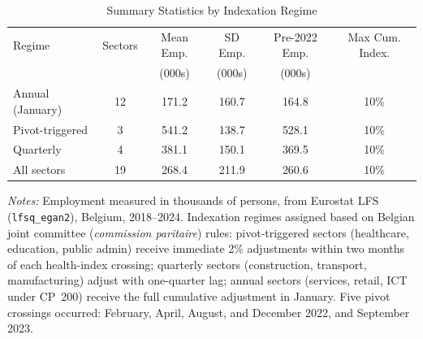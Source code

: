 \begin{table}[t]
\centering
\caption{Summary Statistics by Indexation Regime}
\label{tab:summary}
\begin{tabular}{lccccc}
\hline\hline
Regime & Sectors & Mean Emp. & SD Emp. & Pre-2022 Emp. & Max Cum. Index. \\
 & & (000s) & (000s) & (000s) & \\
\hline
Annual (January) & 12 & 171.2 & 160.7 & 164.8 & 10\% \\
Pivot-triggered & 3 & 541.2 & 138.7 & 528.1 & 10\% \\
Quarterly & 4 & 381.1 & 150.1 & 369.5 & 10\% \\
\hline
All sectors & 19 & 268.4 & 211.9 & 260.6 & 10\% \\
\hline\hline
\end{tabular}
\begin{tablenotes}[flushleft]
\small
\item \textit{Notes:} Employment measured in thousands of persons, from Eurostat LFS (\texttt{lfsq\_egan2}), Belgium, 2018--2024. Indexation regimes assigned based on Belgian joint committee (\textit{commission paritaire}) rules: pivot-triggered sectors (healthcare, education, public admin) receive immediate 2\% adjustments within two months of each health-index crossing; quarterly sectors (construction, transport, manufacturing) adjust with one-quarter lag; annual sectors (services, retail, ICT under CP~200) receive the full cumulative adjustment in January. Five pivot crossings occurred: February, April, August, and December 2022, and September 2023.
\end{tablenotes}
\end{table}

